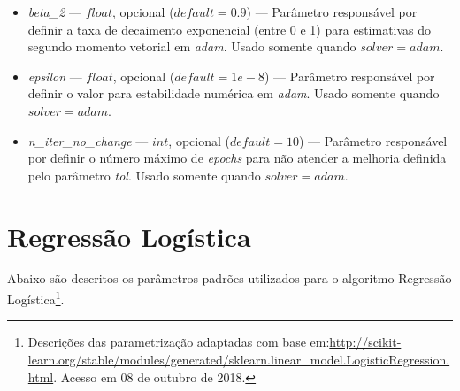 \documentclass[
	12pt,				%
	oneside,			%
	a4paper,			%
	english,			%
	brazil				%
	]{abntex2ppgsi}
\begin{document}
{{{\begin{apendicesenv}
\begin{itemize}
\item \textit{beta\_2} --- $float$, opcional ($default=0.9$) --- Parâmetro responsável por definir a taxa de decaimento exponencial (entre 0 e 1) para estimativas do segundo momento vetorial em \textit{adam}. Usado somente quando $solver=adam$.
\item \textit{epsilon} --- $float$, opcional ($default=1e-8$) --- Parâmetro responsável por definir o valor para estabilidade numérica em \textit{adam}. Usado somente quando $solver=adam$.
\item \textit{n\_iter\_no\_change} --- $int$, opcional ($default=10$) --- Parâmetro responsável por definir o número máximo de \textit{epochs} para não atender a melhoria definida pelo parâmetro \textit{tol}. Usado somente quando $solver=adam$.
\end{itemize}

\section{Regressão Logística}

Abaixo são descritos os parâmetros padrões utilizados para o algoritmo Regressão Logística\footnote{Descrições das parametrização adaptadas com base em:\url{http://scikit-learn.org/stable/modules/generated/sklearn.linear_model.LogisticRegression.html}. Acesso em 08 de outubro de 2018.}.


\end{apendicesenv}}}}
\end{document}
